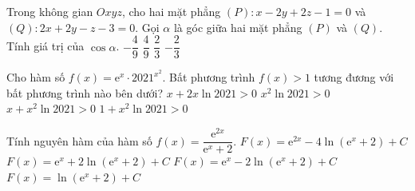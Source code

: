 \begin{ex}%
	Trong không gian $Oxyz$, cho hai mặt phẳng $(P)\colon x-2y+2z-1=0$ và $(Q)\colon2x+2y-z-3=0$. Gọi $\alpha$ là góc giữa hai mặt phẳng $(P)$ và $(Q)$. Tính giá trị của $\cos\alpha$.
	\choice
	{$-\dfrac{4}{9}$}
	{\True $\dfrac{4}{9}$}
	{$\dfrac{2}{3}$}
	{$-\dfrac{2}{3}$}
\end{ex}
\begin{ex}%
	Cho hàm số $f(x)=\mathrm{e}^x\cdot2021^{x^2}$. Bất phương trình $f(x)>1$ tương đương với bất phương trình nào bên dưới?
	\choice
	{$x+2x\ln 2021>0$}
	{$x^2\ln 2021>0$}
	{\True $x+x^2\ln 2021>0$}
	{$1+x^2\ln 2021>0$}
\end{ex}
\begin{ex}%
	Tính nguyên hàm của hàm số $f(x)=\dfrac{\mathrm{e}^{2x}}{\mathrm{e}^x+2}$.
	\choice
	{$F(x)=\mathrm{e}^{2x}-4\ln \left(\mathrm{e}^x+2\right)+C$}
	{$F(x)=\mathrm{e}^x+2\ln \left(\mathrm{e}^x+2\right)+C$}
	{\True $F(x)=\mathrm{e}^x-2\ln \left(\mathrm{e}^x+2\right)+C$}
	{$F(x)=\ln \left(\mathrm{e}^x+2\right)+C$}
\end{ex}
